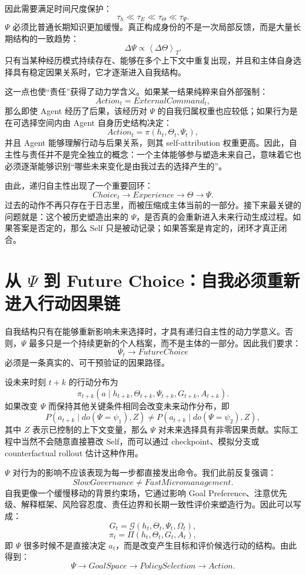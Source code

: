 因此需要满足时间尺度保护：
\[
\tau_h
\ll
\tau_E
\ll
\tau_\Theta
\ll
\tau_\Psi.
\]
$\Psi$ 必须比普通长期知识更加缓慢。真正构成身份的不是一次局部反馈，而是大量长期结构的一致趋势：
\[
\Delta\Psi
\propto
\left\langle
\Delta\Theta
\right\rangle_T.
\]
只有当某种经历模式持续存在、能够在多个上下文中重复出现，并且和主体自身选择具有稳定因果关系时，它才逐渐进入自我结构。

这一点也使“责任”获得了动力学含义。如果某一结果纯粹来自外部强制：
\[
Action_t
=
ExternalCommand_t,
\]
那么即使 Agent 经历了后果，该经历对 $\Psi$ 的自我归属权重也应较低；如果行为是在可选择空间内由 Agent 自身历史结构决定：
\[
Action_t
=
\pi(h_t,\Theta_t,\Psi_t),
\]
并且 Agent 能够理解行动与后果关系，则其 self-attribution 权重更高。因此，自主性与责任并不是完全独立的概念：一个主体能够参与塑造未来自己，意味着它也必须逐渐能够识别“哪些未来变化是由我过去的选择产生的”。

由此，递归自主性出现了一个重要回环：
\[
Choice_t
\rightarrow
Experience
\rightarrow
\Theta
\rightarrow
\Psi.
\]
过去的动作不再只存在于日志里，而被压缩成主体当前的一部分。接下来最关键的问题就是：这个被历史塑造出来的 $\Psi$，是否真的会重新进入未来行动生成过程。如果答案是否定的，那么 Self 只是被动记录；如果答案是肯定的，闭环才真正闭合。

\section{从 \texorpdfstring{$\Psi$}{Psi} 到 Future Choice：自我必须重新进入行动因果链}

自我结构只有在能够重新影响未来选择时，才具有递归自主性的动力学意义。否则，$\Psi$ 最多只是一个持续更新的个人档案，而不是主体的一部分。因此我们要求：
\[
\boxed{
\Psi_t
\rightarrow
FutureChoice
}
\]
必须是一条真实的、可干预验证的因果路径。

设未来时刻 $t+k$ 的行动分布为
\[
\pi_{t+k}
\left(
a\mid
h_{t+k},
\Theta_{t+k},
\Psi_{t+k},
G_{t+k},
A_{t+k}
\right).
\]
如果改变 $\Psi$ 而保持其他关键条件相同会改变未来动作分布，即
\[
P(a_{t+k}\mid do(\Psi=\psi_1),Z)
\neq
P(a_{t+k}\mid do(\Psi=\psi_2),Z),
\]
其中 $Z$ 表示已控制的上下文变量，那么 $\Psi$ 对未来选择具有非零因果贡献。实际工程中当然不会随意直接篡改 Self，而可以通过 checkpoint、模拟分支或 counterfactual rollout 估计这种作用。

$\Psi$ 对行为的影响不应该表现为每一步都直接发出命令。我们此前反复强调：
\[
\boxed{
SlowGovernance
\neq
FastMicromanagement.
}
\]
自我更像一个缓慢移动的背景约束场，它通过影响 Goal Preference、注意优先级、解释框架、风险容忍度、责任边界和长期一致性评价来塑造行为。因此可以写成：
\[
G_t
=
\mathcal G(h_t,\Theta_t,\Psi_t,\Omega_t),
\]
\[
\pi_t
=
\Pi(h_t,\Theta_t,G_t,A_t),
\]
即 $\Psi$ 很多时候不是直接决定 $a_t$，而是改变产生目标和评价候选行动的结构。由此得到：
\[
\Psi
\rightarrow
GoalSpace
\rightarrow
PolicySelection
\rightarrow
Action.
\]

